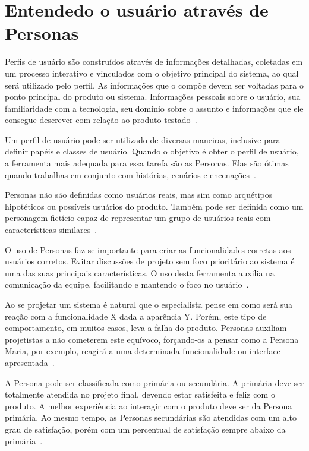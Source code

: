 \section{Entendedo o usuário através de Personas}
\label{sec:personas}

Perfis de usuário são construídos através de informações detalhadas, coletadas em um processo interativo e vinculados com o objetivo principal do sistema, ao qual será utilizado pelo perfil. As informações que o compõe devem ser voltadas para o ponto principal do produto ou sistema. Informações pessoais sobre o usuário, sua familiaridade com a tecnologia, seu domínio sobre o assunto e informações que ele consegue descrever com relação ao produto testado~\cite{barbosa:2010}.

Um perfil de usuário pode ser utilizado de diversas maneiras, inclusive para definir papéis e classes de usuário. Quando o objetivo é obter o perfil de usuário, a ferramenta mais adequada para essa tarefa são as Personas. Elas são ótimas quando trabalhas em conjunto com histórias, cenários e encenações~\cite{hartson:2012}.

Personas não são definidas como usuários reais, mas sim como arquétipos hipotéticos ou possíveis usuários do produto. Também pode ser definida como um personagem fictício capaz de representar um grupo de usuários reais com características similares~\cite{aquino:2005, barbosa:2010, hartson:2012, masiero:2013}.

O uso de Personas faz-se importante para criar as funcionalidades corretas aos usuários corretos. Evitar discussões de projeto sem foco prioritário ao sistema é uma das suas principais características. O uso desta ferramenta auxilia na comunicação da equipe, facilitando e mantendo o foco no usuário~\cite{aquino:2005, hartson:2012, masiero:2013}.

Ao se projetar um sistema é natural que o especialista pense em como será sua reação com a funcionalidade X dada a aparência Y. Porém, este tipo de comportamento, em muitos casos, leva a falha do produto. Personas auxiliam projetistas a não cometerem este equívoco, forçando-os a pensar como a Persona Maria, por exemplo, reagirá a uma determinada funcionalidade ou interface apresentada~\cite{hartson:2012}.

A Persona pode ser classificada como primária ou secundária. A primária deve ser totalmente atendida no projeto final, devendo estar satisfeita e feliz com o produto. A melhor experiência ao interagir com o produto deve ser da Persona primária. Ao mesmo tempo, as Personas secundárias são atendidas com um alto grau de satisfação, porém com um percentual de satisfação sempre abaixo da primária~\cite{hartson:2012}.

